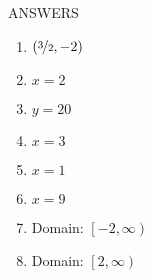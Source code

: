 \documentclass[12pt]{article}
\begin{document}
\newpage

ANSWERS

\begin{multicols}{2}
\begin{enumerate}
	\item $\left( \nicefrac{3}{2} ,-2 \right)$
    \item $x = 2$
    \item $y = 20$
    \item $x = 3$
    \item $x = 1$
    \item $x = 9$
	\item Domain: $\left[ -2, \infty \right)$
	\item Domain: $\left[ 2, \infty \right)$
    
\end{enumerate}
\end{multicols}
\end{document}
